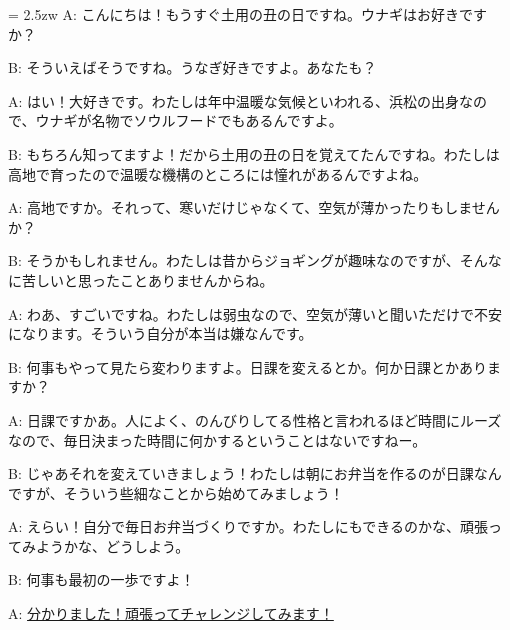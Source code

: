 \documentclass[11pt]{amsart}
\title{}
\author{}
\newenvironment{hangall}[1]{\hangindent = 2.5zw\everypar{\hangindent = 2.5zw}}{}
\begin{document}
\maketitle
\begin{hangall}{}%
A: こんにちは！もうすぐ土用の丑の日ですね。ウナギはお好きですか？

B: そういえばそうですね。うなぎ好きですよ。あなたも？

A: はい！大好きです。わたしは年中温暖な気候といわれる、浜松の出身なので、ウナギが名物でソウルフードでもあるんですよ。

B: もちろん知ってますよ！だから土用の丑の日を覚えてたんですね。わたしは高地で育ったので温暖な機構のところには憧れがあるんですよね。

A: 高地ですか。それって、寒いだけじゃなくて、空気が薄かったりもしませんか？

B: そうかもしれません。わたしは昔からジョギングが趣味なのですが、そんなに苦しいと思ったことありませんからね。

A: わあ、すごいですね。わたしは弱虫なので、空気が薄いと聞いただけで不安になります。そういう自分が本当は嫌なんです。

B: 何事もやって見たら変わりますよ。日課を変えるとか。何か日課とかありますか？

A: 日課ですかあ。人によく、のんびりしてる性格と言われるほど時間にルーズなので、毎日決まった時間に何かするということはないですねー。

B: じゃあそれを変えていきましょう！わたしは朝にお弁当を作るのが日課なんですが、そういう些細なことから始めてみましょう！

A: えらい！自分で毎日お弁当づくりですか。わたしにもできるのかな、頑張ってみようかな、どうしよう。

B: 何事も最初の一歩ですよ！

A: \ul{分かりました！頑張ってチャレンジしてみます！}\end{hangall}
\end{document}
